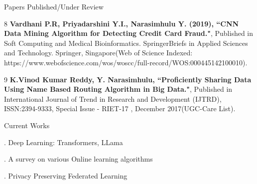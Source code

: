 \documentclass{resume} %
\begin{document}
\begin{rSection}{Papers Published/Under Review}
\begin{rSubsection}{}{}{}{}
		\item[8] \textbf{Vardhani P.R, Priyadarshini Y.I., Narasimhulu Y. (2019), ``CNN Data Mining Algorithm for Detecting Credit Card Fraud."}, Published in Soft Computing and Medical Bioinformatics. SpringerBriefs in Applied Sciences and Technology. Springer, Singapore(Web of Science Indexed: https://www.webofscience.com/wos/woscc/full-record/WOS:000445142100010).
		
		\item[9] \textbf{K.Vinod Kumar Reddy, Y. Narasimhulu, ``Proficiently Sharing Data Using Name Based Routing Algorithm in Big Data."}, Published in International Journal of Trend in Research and Development (IJTRD), ISSN:2394-9333, Special Issue - RIET-17 , December 2017(UGC-Care List).
	\end{rSubsection}
	
	
\end{rSection}

\begin{rSection}{Current Works}
	
	\begin{rSubsection}{}{}{}{}	
		\item[.] Deep Learning: Transformers, LLama
		\item[.] A survey on various Online learning algorithms
		\item[.] Privacy Preserving Federated Learning
	\end{rSubsection}
\end{rSection}
\end{document}
